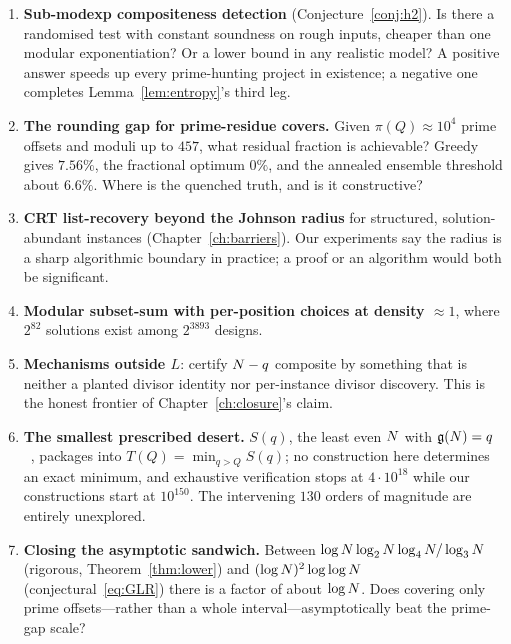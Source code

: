 \begin{enumerate}
\item \textbf{Sub-modexp compositeness detection} (Conjecture~\ref{conj:h2}).
Is there a randomised test with constant soundness on rough inputs, cheaper than
one modular exponentiation? Or a lower bound in any realistic model? A positive
answer speeds up every prime-hunting project in existence; a negative one
completes Lemma~\ref{lem:entropy}'s third leg.

\item \textbf{The rounding gap for prime-residue covers.} Given $\pi(Q)\approx
10^{4}$ prime offsets and moduli up to $457$, what residual fraction is
achievable? Greedy gives $7.56\%$, the fractional optimum $0\%$, and the annealed
ensemble threshold about $6.6\%$. Where is the quenched truth, and is it
constructive?

\item \textbf{CRT list-recovery beyond the Johnson radius} for structured,
solution-abundant instances (Chapter~\ref{ch:barriers}). Our experiments say the
radius is a sharp algorithmic boundary in practice; a proof or an algorithm
would both be significant.

\item \textbf{Modular subset-sum with per-position choices at density
$\approx1$}, where $2^{82}$ solutions exist among $2^{3893}$ designs.

\item \textbf{Mechanisms outside $L$}: certify $N-q$ composite by something
that is neither a planted divisor identity nor per-instance divisor discovery.
This is the honest frontier of Chapter~\ref{ch:closure}'s claim.

\item \textbf{The smallest prescribed desert.} $S(q)$, the least even $N$ with
$\mathfrak{g}(N)=q$~\cite{GLvdtR}, packages into $T(Q)=\min_{q>Q}S(q)$; no construction
here determines an exact minimum, and exhaustive verification stops at
$4\cdot10^{18}$ while our constructions start at $10^{150}$. The intervening
$130$ orders of magnitude are entirely unexplored.

\item \textbf{Closing the asymptotic sandwich.} Between
$\log N\log_2N\log_4N/\log_3N$ (rigorous, Theorem~\ref{thm:lower}) and
$(\log N)^{2}\log\log N$ (conjectural~\eqref{eq:GLR}) there is a factor of about
$\log N$. Does covering only prime offsets---rather than a whole
interval---asymptotically beat the prime-gap scale?
\end{enumerate}

